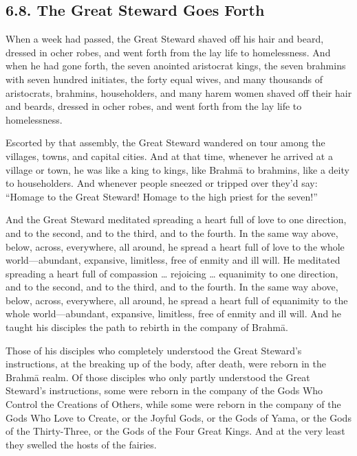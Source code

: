 \documentclass[12pt,openany]{book}%
\begin{document}
\subsection*{6.8. The Great Steward Goes Forth }

When a week had passed, the Great Steward shaved off his hair and beard, dressed in ocher robes, and went forth from the lay life to homelessness. And when he had gone forth, the seven anointed aristocrat kings, the seven brahmins with seven hundred initiates, the forty equal wives, and many thousands of aristocrats, brahmins, householders, and many harem women shaved off their hair and beards, dressed in ocher robes, and went forth from the lay life to homelessness. 

Escorted by that assembly, the Great Steward wandered on tour among the villages, towns, and capital cities. And at that time, whenever he arrived at a village or town, he was like a king to kings, like \textsanskrit{Brahmā} to brahmins, like a deity to householders. And whenever people sneezed or tripped over they’d say: “Homage to the Great Steward! Homage to the high priest for the seven!” 

And the Great Steward meditated spreading a heart full of love to one direction, and to the second, and to the third, and to the fourth. In the same way above, below, across, everywhere, all around, he spread a heart full of love to the whole world—abundant, expansive, limitless, free of enmity and ill will. He meditated spreading a heart full of compassion … rejoicing … equanimity to one direction, and to the second, and to the third, and to the fourth. In the same way above, below, across, everywhere, all around, he spread a heart full of equanimity to the whole world—abundant, expansive, limitless, free of enmity and ill will. And he taught his disciples the path to rebirth in the company of \textsanskrit{Brahmā}. 

Those of his disciples who completely understood the Great Steward’s instructions, at the breaking up of the body, after death, were reborn in the \textsanskrit{Brahmā} realm. Of those disciples who only partly understood the Great Steward’s instructions, some were reborn in the company of the Gods Who Control the Creations of Others, while some were reborn in the company of the Gods Who Love to Create, or the Joyful Gods, or the Gods of Yama, or the Gods of the Thirty-Three, or the Gods of the Four Great Kings. And at the very least they swelled the hosts of the fairies. 
\end{document}
